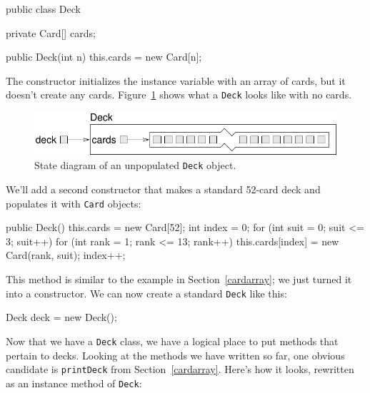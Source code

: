 \documentclass[12pt]{book}
\theoremstyle{exercise}
\newcommand{\java}[1]{\verb"#1"}
\begin{document}
\begin{code}
public class Deck {
    private Card[] cards;

    public Deck(int n) {
        this.cards = new Card[n];
    }
}
\end{code}


The constructor initializes the instance variable with an array of cards, but it doesn't create any cards.
Figure~\ref{fig.deckobject} shows what a \java{Deck} looks like with no cards.

\begin{figure}
\begin{center}
\includegraphics{figs/deckobject.pdf}
\caption{State diagram of an unpopulated \java{Deck} object.}
\label{fig.deckobject}
\end{center}
\end{figure}

We'll add a second constructor that makes a standard 52-card deck and populates it with \java{Card} objects:

\begin{code}
    public Deck() {
        this.cards = new Card[52];
        int index = 0;
        for (int suit = 0; suit <= 3; suit++) {
            for (int rank = 1; rank <= 13; rank++) {
                this.cards[index] = new Card(rank, suit);
                index++;
            }
        }
    }
\end{code}


This method is similar to the example in Section~\ref{cardarray}; we just turned it into a constructor.
We can now create a standard \java{Deck} like this:

\begin{code}
    Deck deck = new Deck();
\end{code}


Now that we have a \java{Deck} class, we have a logical place to put methods that pertain to decks.
Looking at the methods we have written so far, one obvious candidate is \java{printDeck} from Section~\ref{cardarray}.
Here's how it looks, rewritten as an instance method of \java{Deck}:
\end{document}
